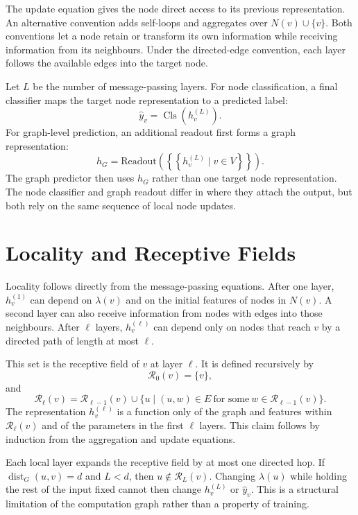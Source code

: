 The update equation gives the node direct access to its previous representation.
An alternative convention adds self-loops and aggregates over $N(v)\cup\{v\}$.
Both conventions let a node retain or transform its own information while receiving information from its neighbours.
Under the directed-edge convention, each layer follows the available edges into the target node.

Let $L$ be the number of message-passing layers.
For node classification, a final classifier maps the target node representation to a predicted label:
\[
\hat{y}_v=\operatorname{Cls}\left(h_v^{(L)}\right).
\]
For graph-level prediction, an additional readout first forms a graph representation:
\[
h_G=\mathrm{Readout}\left(\left\{\!\left\{h_v^{(L)}\mid v\in V\right\}\!\right\}\right).
\]
The graph predictor then uses $h_G$ rather than one target node representation.
The node classifier and graph readout differ in where they attach the output, but both rely on the same sequence of local node updates.

\section{Locality and Receptive Fields}

Locality follows directly from the message-passing equations.
After one layer, $h_v^{(1)}$ can depend on $\lambda(v)$ and on the initial features of nodes in $N(v)$.
A second layer can also receive information from nodes with edges into those neighbours.
After $\ell$ layers, $h_v^{(\ell)}$ can depend only on nodes that reach $v$ by a directed path of length at most $\ell$.

This set is the receptive field of $v$ at layer $\ell$.
It is defined recursively by
\[
\mathcal{R}_0(v)=\{v\},
\]
and
\[
\mathcal{R}_{\ell}(v)=\mathcal{R}_{\ell-1}(v)\cup\{u\mid (u,w)\in E\ \textrm{for some}\ w\in\mathcal{R}_{\ell-1}(v)\}.
\]
The representation $h_v^{(\ell)}$ is a function only of the graph and features within $\mathcal{R}_{\ell}(v)$ and of the parameters in the first $\ell$ layers.
This claim follows by induction from the aggregation and update equations.

Each local layer expands the receptive field by at most one directed hop.
If $\operatorname{dist}_G(u,v)=d$ and $L<d$, then $u\notin\mathcal{R}_L(v)$.
Changing $\lambda(u)$ while holding the rest of the input fixed cannot then change $h_v^{(L)}$ or $\hat{y}_v$.
This is a structural limitation of the computation graph rather than a property of training.

